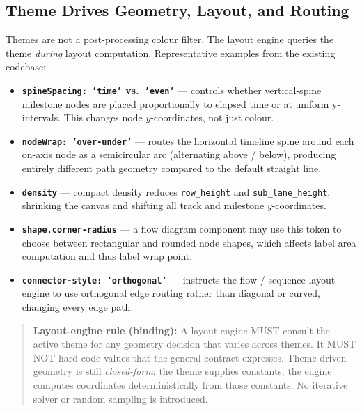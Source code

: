 \subsection{Theme Drives Geometry, Layout, and Routing}
\label{sec:themes-drives-layout}

Themes are not a post-processing colour filter. The layout engine queries the theme
\emph{during} layout computation. Representative examples from the existing codebase:

\begin{itemize}
  \item \textbf{\texttt{spineSpacing: 'time'} vs.\ \texttt{'even'}} --- controls whether
        vertical-spine milestone nodes are placed proportionally to elapsed time or at
        uniform y-intervals. This changes node $y$-coordinates, not just colour.
  \item \textbf{\texttt{nodeWrap: 'over-under'}} --- routes the horizontal timeline spine
        around each on-axis node as a semicircular arc (alternating above / below),
        producing entirely different path geometry compared to the default straight line.
  \item \textbf{\texttt{density}} --- compact density reduces \texttt{row\_height} and
        \texttt{sub\_lane\_height}, shrinking the canvas and shifting all track and
        milestone $y$-coordinates.
  \item \textbf{\texttt{shape.corner-radius}} --- a flow diagram component may use this
        token to choose between rectangular and rounded node shapes, which affects label
        area computation and thus label wrap point.
  \item \textbf{\texttt{connector-style: 'orthogonal'}} --- instructs the flow / sequence
        layout engine to use orthogonal edge routing rather than diagonal or curved,
        changing every edge path.
\end{itemize}

\begin{quote}
\textbf{Layout-engine rule (binding):} A layout engine MUST consult the active theme for
any geometry decision that varies across themes. It MUST NOT hard-code values that the
general contract expresses. Theme-driven geometry is still \emph{closed-form}: the theme
supplies constants; the engine computes coordinates deterministically from those constants.
No iterative solver or random sampling is introduced.
\end{quote}


